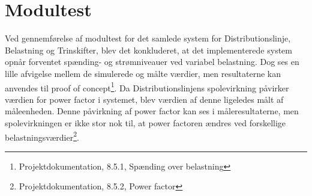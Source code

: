 
\section{Modultest}

Ved gennemførelse af modultest for det samlede system for Distributionslinje, Belastning og Trinskifter, blev det konkluderet, at det implementerede system opnår forventet spænding- og strømniveauer ved variabel belastning. Dog ses en lille afvigelse mellem de simulerede og målte værdier, men resultaterne kan anvendes til proof of concept\footnote{Projektdokumentation, 8.5.1, Spænding over belastning}. Da Distributionslinjens spolevirkning påvirker værdien for power factor i systemet, blev værdien af denne ligeledes målt af måleenheden. Denne påvirkning af power factor kan ses i måleresultaterne, men spolevirkningen er ikke stor nok til, at power factoren ændres ved forskellige belastningsværdier\footnote{Projektdokumentation, 8.5.2, Power factor}. 
